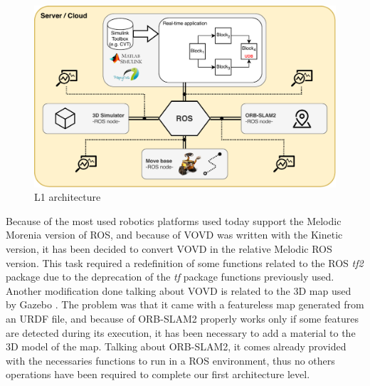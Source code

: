 \begin{figure}
	\centering
	\includegraphics[width=\textwidth]{images/L1-arch}
	\caption{L1 architecture}
	\label{fig:l1archexp}
\end{figure}

Because of the most used robotics platforms used today support the Melodic Morenia \cite{rosmelodic} version of ROS, and because of VOVD was written with the Kinetic version, it has been decided to convert VOVD in the relative Melodic ROS version. This task required a redefinition of some functions related to the ROS \textit{tf2} package \cite{tfros} due to the deprecation of the \textit{tf} package functions previously used. 
Another modification done talking about VOVD is related to the 3D map used by Gazebo \cite{Gazebo}. The problem was that it came with a featureless map generated from an URDF file, and because of ORB-SLAM2 properly works only if some features are detected during its execution, it has been necessary to add a material to the 3D model of the map.
Talking about ORB-SLAM2, it comes already provided with the necessaries functions to run in a ROS environment, thus no others operations have been required to complete our first architecture level.



